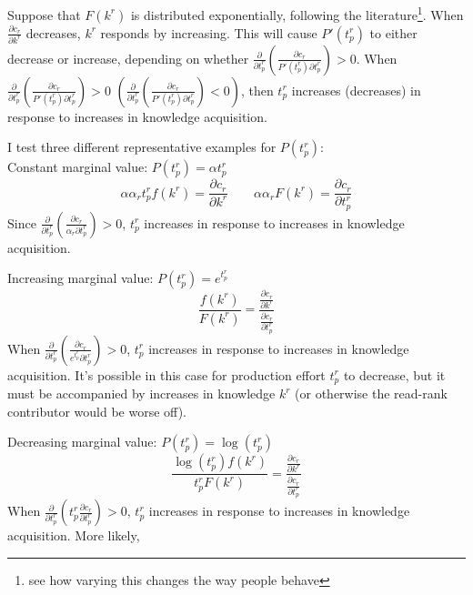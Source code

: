 \documentclass[source/paper/main.tex]{subfiles}
\begin{document}
Suppose that $F(k^r)$ is distributed exponentially, following the literature\footnote{see how varying this changes the way people behave}. When $\frac{\partial c_r}{\partial k^r}$ decreases,  $k^r$ responds by increasing. This will cause $P'(t_p^r)$ to either decrease or increase, depending on whether $\frac{\partial }{\partial t_p^r}(\frac{\partial c_r}{P'(t_p^r)\partial t_p^r})>0$. When $\frac{\partial }{\partial t_p^r}(\frac{\partial c_r}{P'(t_p^r)\partial t_p^r})>0$ $(\frac{\partial }{\partial t_p^r}(\frac{\partial c_r}{P'(t_p^r)\partial t_p^r})<0)$, then $t_p^r$ increases (decreases) in response to increases in knowledge acquisition. 


I test three different representative examples for $P(t_p^r)$:\\
Constant marginal value: $P(t_p^r) = \alpha t_p^r$
$$\alpha \alpha_r  t_p^r f(k^r)= \frac{\partial c_r}{\partial k^r} \qquad \alpha \alpha_r F(k^r) = \frac{\partial c_r}{\partial t_p^r}$$
Since $\frac{\partial }{\partial t_p^r}(\frac{\partial c_r}{\alpha_r \partial t_p^r})>0$, $t_p^r$ increases in response to increases in knowledge acquisition. 
 
 Increasing marginal value: $P(t_p^r) = e^{t_p^r}$
$$\frac{f(k^r)}{F(k^r)} = \frac{\frac{\partial c_r}{\partial k^r}}{\frac{\partial c_r}{\partial t_p^r}}$$
When $\frac{\partial }{\partial t_p^r}(\frac{\partial c_r}{e^{t_p^r} \partial t_p^r})>0$, $t_p^r$ increases in response to increases in knowledge acquisition. It's possible in this case for production effort $t_p^r$ to decrease, but it must be accompanied by increases in knowledge $k^r$ (or otherwise the read-rank contributor would be worse off). 

Decreasing marginal value: $P(t_p^r) = \log(t_p^r)$
$$\frac{\log(t_p^r)f(k^r)}{t_p^rF(k^r)} = \frac{\frac{\partial c_r}{\partial k^r}}{\frac{\partial c_r}{\partial t_p^r}}$$
When $\frac{\partial }{\partial t_p^r}(t_p^r \frac{\partial c_r}{\partial t_p^r})>0$, $t_p^r$ increases in response to increases in knowledge acquisition. More likely, \\
\end{document}
